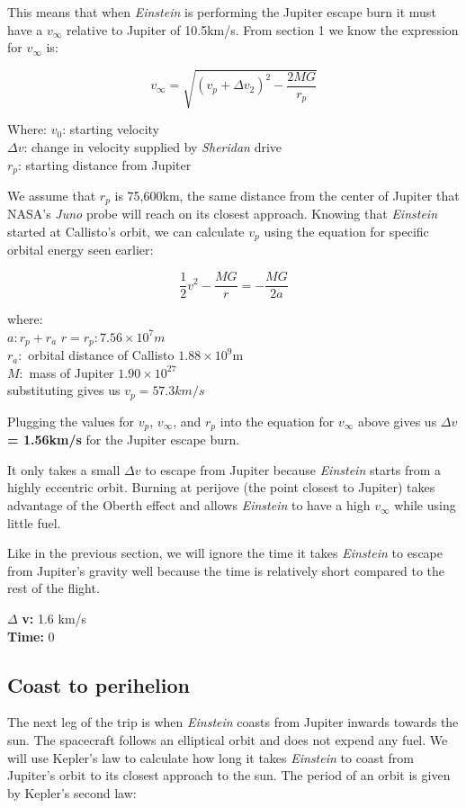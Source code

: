 \documentclass[12pt]{article} %
\begin{document}
This means that when \textit{Einstein} is performing the Jupiter escape burn it must have a $v_{\infty}$ relative to Jupiter of 10.5km/s. From section 1 we know the expression for $v_{\infty}$ is:

$$v_{\infty} = \sqrt{(v_p + \Delta v_2)^2-\frac{2MG}{r_p}}$$

Where:
$v_0$: starting velocity\\
$\Delta v$: change in velocity supplied by \textit{Sheridan} drive\\
$r_p$: starting distance from Jupiter

We assume that $r_p$ is 75,600km, the same distance from the center of Jupiter that NASA's \textit{Juno} probe will reach on its closest approach. Knowing that \textit{Einstein} started at Callisto's orbit, we can calculate $v_p$ using the equation for specific orbital energy seen earlier:

$$\frac{1}{2}v^2-\frac{MG}{r} = -\frac{MG}{2a}$$

where:\\
$a: r_p + r_a$
$r = r_p: 7.56\times 10^7m$\\
$r_a:$ orbital distance of Callisto $1.88 \times 10^9$m\\
$M:$ mass of Jupiter $1.90\times10^27$\\


substituting gives us \textbf{$v_p = 57.3 km/s$}

Plugging the values for $v_p$, $v_{\infty}$, and $r_p$ into the equation for $v_{\infty}$ above gives us $\Delta v$ \textbf{= 1.56km/s} for the Jupiter escape burn.

It only takes a small $\Delta v$ to escape from Jupiter because \textit{Einstein} starts from a highly eccentric orbit. Burning at perijove (the point closest to Jupiter) takes advantage of the Oberth effect and allows \textit{Einstein} to have a high $v_{\infty}$ while using little fuel.

Like in the previous section, we will ignore the time it takes \textit{Einstein} to escape from Jupiter's gravity well because the time is relatively short compared to the rest of the flight. 


$\Delta$ \textbf{v:} 1.6 km/s\\
\textbf{Time:} 0

\subsection{Coast to perihelion}
The next leg of the trip is when \textit{Einstein} coasts from Jupiter inwards towards the sun. The spacecraft follows an elliptical orbit and does not expend any fuel. We will use Kepler's law to calculate how long it takes \textit{Einstein} to coast from Jupiter's orbit to its closest approach to the sun. The period of an orbit is given by Kepler's second law:
\end{document}
